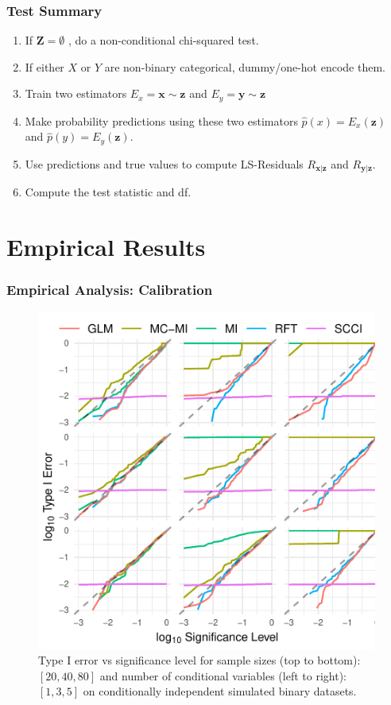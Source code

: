 \documentclass{beamer}
\begin{document}
\begin{frame}
	\frametitle{Test Summary}
	\begin{enumerate}
		\setlength\itemsep{1em}
		\item If $\mathbf{Z} = \emptyset $ , do a non-conditional chi-squared test.
		\item If either $ X $ or $ Y $ are non-binary categorical,
			dummy/one-hot encode them.
		\item Train two estimators $ E_x = \bm{x} \sim \bm{z} $ and
			$ E_y = \bm{y} \sim \bm{z} $
		\item Make probability predictions using these two estimators 
			$ \hat{p}(x) = E_x(\bm{z}) $ and $ \hat{p}(y) =
			E_y(\bm{\bm{z}}) $.
		\item Use predictions and true values to compute LS-Residuals $ R_{\bm{x}|\bm{z}} $ and $ R_{\bm{y}|\bm{z}} $.	
		\item Compute the test statistic and df.
	\end{enumerate}
\end{frame}

\section{Empirical Results}

\begin{frame}
	\frametitle{Empirical Analysis: Calibration}
	\begin{figure}
		\centering
		\includegraphics[scale=0.8]{imgs/calibration_add_vars.pdf}
		\caption*{Type I error vs significance level for sample sizes (top to
		bottom): $ [20, 40, 80] $ and number of conditional variables (left to
		right): $ [1, 3, 5] $ on conditionally independent simulated binary
		datasets.}
	\end{figure}
\end{frame}
\end{document}
